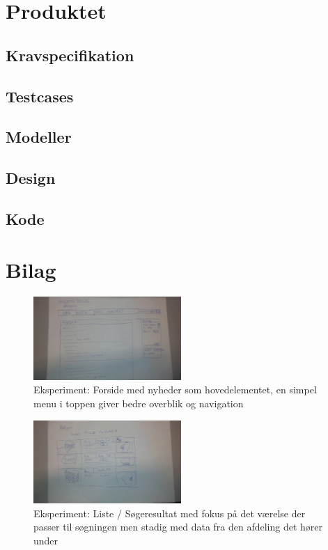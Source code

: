 \documentclass[12pt, a4paper]{report}
\begin{document}
\chapter{Produktet}
\section{Kravspecifikation}


\section{Testcases}


\section{Modeller}


\section{Design}


\section{Kode}


\chapter{Bilag}

\begin{figure}
\includegraphics[width=0.5\textwidth]{eksperiment_forside}
\caption{Eksperiment: Forside med nyheder som hovedelementet, en simpel menu i toppen giver bedre overblik og navigation}
\label{e_forside}
\end{figure}

\begin{figure}
\includegraphics[width=0.5\textwidth]{eksperiment_liste}
\caption{Eksperiment: Liste / Søgeresultat med fokus på det værelse der passer til søgningen men stadig med data fra den afdeling det hører under}
\label{e_liste}
\end{figure}
\end{document}
